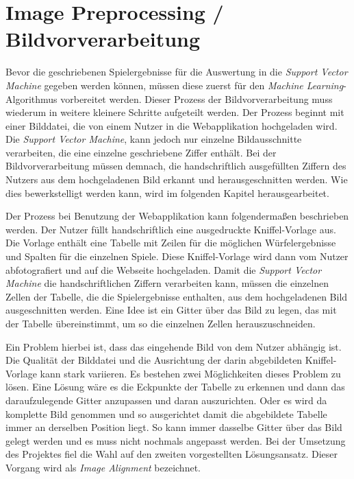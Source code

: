 \section{Image Preprocessing / Bildvorverarbeitung} \label{sec:imagepreprocessing}
Bevor die geschriebenen Spielergebnisse für die Auswertung in die \textit{Support Vector Machine} gegeben werden können, müssen diese zuerst
für den \textit{Machine Learning}-Algorithmus vorbereitet werden. Dieser Prozess der Bildvorverarbeitung muss wiederum in weitere kleinere
Schritte aufgeteilt werden. Der Prozess beginnt mit einer Bilddatei, die von einem Nutzer in die Webapplikation hochgeladen wird. 
Die \textit{Support Vector Machine}, kann jedoch nur einzelne Bildausschnitte verarbeiten, die eine einzelne geschriebene Ziffer enthält.
Bei der Bildvorverarbeitung müssen demnach, die handschriftlich ausgefüllten Ziffern des Nutzers aus dem hochgeladenen Bild erkannt und
herausgeschnitten werden. Wie dies bewerkstelligt werden kann, wird im folgenden Kapitel herausgearbeitet.

Der Prozess bei Benutzung der Webapplikation kann folgendermaßen beschrieben werden. Der Nutzer füllt handschriftlich eine ausgedruckte Kniffel-Vorlage aus.
Die Vorlage enthält eine Tabelle mit Zeilen für die möglichen Würfelergebnisse und Spalten für die einzelnen Spiele. Diese Kniffel-Vorlage 
wird dann vom Nutzer abfotografiert und auf die Webseite hochgeladen. Damit die \textit{Support Vector Machine} die handschriftlichen Ziffern verarbeiten kann,
müssen die einzelnen Zellen der Tabelle, die die Spielergebnisse enthalten, aus dem hochgeladenen Bild ausgeschnitten werden. Eine Idee ist
ein Gitter über das Bild zu legen, das mit der Tabelle übereinstimmt, um so die einzelnen Zellen herauszuschneiden.

Ein Problem hierbei ist, dass das eingehende Bild von dem Nutzer abhängig ist. Die Qualität der Bilddatei und die Ausrichtung der darin abgebildeten 
Kniffel-Vorlage kann stark variieren. Es bestehen zwei Möglichkeiten dieses Problem zu lösen. Eine Lösung wäre es die Eckpunkte der Tabelle zu erkennen und 
dann das daraufzulegende Gitter anzupassen und daran auszurichten. Oder es wird da komplette Bild genommen und so ausgerichtet damit die abgebildete Tabelle
immer an derselben Position liegt. So kann immer dasselbe Gitter über das Bild gelegt werden und es muss nicht nochmals angepasst werden.
Bei der Umsetzung des Projektes fiel die Wahl auf den zweiten vorgestellten Lösungsansatz. Dieser Vorgang wird als \textit{Image Alignment} bezeichnet.


